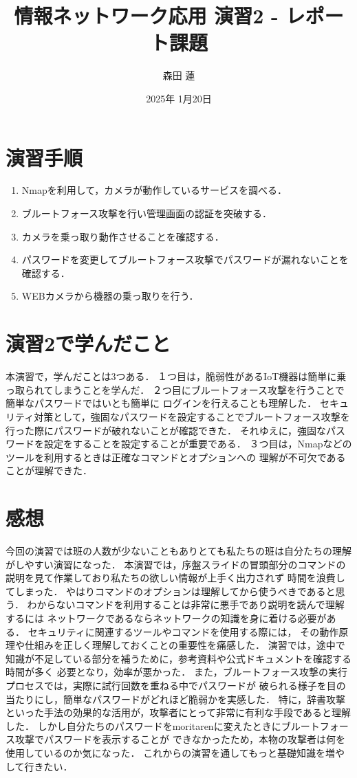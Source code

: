 \documentclass{jlreq}
\title{情報ネットワーク応用 演習2 - レポート課題}
\author{森田 蓮}
\date{2025年 1月20日}
\begin{document}
\maketitle

\section{演習手順}
\begin{enumerate}
    \item Nmapを利用して，カメラが動作しているサービスを調べる．
    \item ブルートフォース攻撃を行い管理画面の認証を突破する．
    \item カメラを乗っ取り動作させることを確認する．
    \item パスワードを変更してブルートフォース攻撃でパスワードが漏れないことを確認する．
    \item WEBカメラから機器の乗っ取りを行う．
\end{enumerate}

\section{演習2で学んだこと}
本演習で，学んだことは3つある．
１つ目は，脆弱性があるIoT機器は簡単に乗っ取られてしまうことを学んだ．
２つ目にブルートフォース攻撃を行うことで簡単なパスワードではいとも簡単に
ログインを行えることも理解した．
セキュリティ対策として，強固なパスワードを設定することでブルートフォース攻撃を
行った際にパスワードが破れないことが確認できた．
それゆえに，強固なパスワードを設定をすることを設定することが重要である．
３つ目は，Nmapなどのツールを利用するときは正確なコマンドとオプションへの
理解が不可欠であることが理解できた．

\section{感想}
今回の演習では班の人数が少ないこともありとても私たちの班は自分たちの理解がしやすい演習になった．
本演習では，序盤スライドの冒頭部分のコマンドの説明を見て作業しており私たちの欲しい情報が上手く出力されず
時間を浪費してしまった．
やはりコマンドのオプションは理解してから使うべきであると思う．
わからないコマンドを利用することは非常に悪手であり説明を読んで理解するには
ネットワークであるならネットワークの知識を身に着ける必要がある．
セキュリティに関連するツールやコマンドを使用する際には，
その動作原理や仕組みを正しく理解しておくことの重要性を痛感した．
演習では，途中で知識が不足している部分を補うために，参考資料や公式ドキュメントを確認する時間が多く
必要となり，効率が悪かった．
また，ブルートフォース攻撃の実行プロセスでは，実際に試行回数を重ねる中でパスワードが
破られる様子を目の当たりにし，簡単なパスワードがどれほど脆弱かを実感した．
特に，辞書攻撃といった手法の効果的な活用が，攻撃者にとって非常に有利な手段であると理解した．
しかし自分たちのパスワードをmoritarenに変えたときにブルートフォース攻撃でパスワードを表示することが
できなかったため，本物の攻撃者は何を使用しているのか気になった．
これからの演習を通してもっと基礎知識を増やして行きたい．
\end{document}
